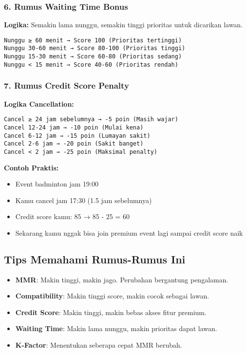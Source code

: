 \documentclass[12pt]{article}
\begin{document}
\subsubsection{6. Rumus Waiting Time Bonus}

\textbf{Logika:}
Semakin lama nunggu, semakin tinggi prioritas untuk dicarikan lawan.

\begin{lstlisting}[language=text, caption=Waiting Time Bonus Logic]
Nunggu ≥ 60 menit → Score 100 (Prioritas tertinggi)
Nunggu 30-60 menit → Score 80-100 (Prioritas tinggi)
Nunggu 15-30 menit → Score 60-80 (Prioritas sedang)
Nunggu < 15 menit → Score 40-60 (Prioritas rendah)
\end{lstlisting}

\subsubsection{7. Rumus Credit Score Penalty}

\textbf{Logika Cancellation:}
\begin{lstlisting}[language=text, caption=Cancellation Penalty Logic]
Cancel ≥ 24 jam sebelumnya → -5 poin (Masih wajar)
Cancel 12-24 jam → -10 poin (Mulai kena)
Cancel 6-12 jam → -15 poin (Lumayan sakit)
Cancel 2-6 jam → -20 poin (Sakit banget)
Cancel < 2 jam → -25 poin (Maksimal penalty)
\end{lstlisting}

\textbf{Contoh Praktis:}
\begin{itemize}
    \item Event badminton jam 19:00
    \item Kamu cancel jam 17:30 (1.5 jam sebelumnya)
    \item Credit score kamu: 85 → 85 - 25 = 60
    \item Sekarang kamu nggak bisa join premium event lagi sampai credit score naik
\end{itemize}

\subsection{Tips Memahami Rumus-Rumus Ini}

\begin{itemize}
    \item \textbf{MMR}: Makin tinggi, makin jago. Perubahan bergantung pengalaman.
    \item \textbf{Compatibility}: Makin tinggi score, makin cocok sebagai lawan.
    \item \textbf{Credit Score}: Makin tinggi, makin bebas akses fitur premium.
    \item \textbf{Waiting Time}: Makin lama nunggu, makin prioritas dapat lawan.
    \item \textbf{K-Factor}: Menentukan seberapa cepat MMR berubah.
\end{itemize}
\end{document}
